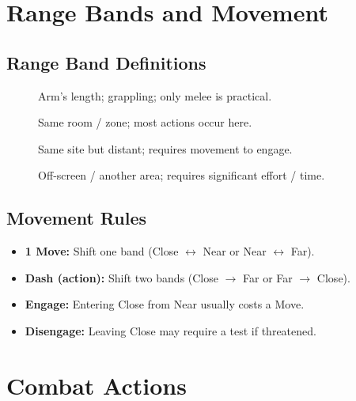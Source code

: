 \section{Range Bands and Movement}\label{sec:range_bands}

\subsection{Range Band Definitions}\label{subsec:range_definitions}
\begin{description}
    \item[] Arm's length; grappling; only melee is practical.
    \item[] Same room / zone; most actions occur here.
    \item[] Same site but distant; requires movement to engage.
    \item[] Off‑screen / another area; requires significant effort / time.
\end{description}

\subsection{Movement Rules}\label{subsec:movement_rules}
\begin{itemize}
    \item \textbf{1 Move:} Shift one band (Close $\leftrightarrow$ Near or Near $\leftrightarrow$ Far).
    \item \textbf{Dash (action):} Shift two bands (Close $\rightarrow$ Far or Far $\rightarrow$ Close).
    \item \textbf{Engage:} Entering Close from Near usually costs a Move.
    \item \textbf{Disengage:} Leaving Close may require a test if threatened.
\end{itemize}

\section{Combat Actions}\label{sec:combat_actions}

